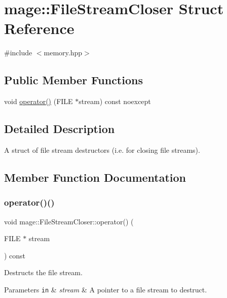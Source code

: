 \hypertarget{structmage_1_1_file_stream_closer}{}\section{mage\+:\+:File\+Stream\+Closer Struct Reference}
\label{structmage_1_1_file_stream_closer}


{\ttfamily \#include $<$memory.\+hpp$>$}

\subsection*{Public Member Functions}
\begin{DoxyCompactItemize}
\item 
void \hyperlink{structmage_1_1_file_stream_closer_a87ef6007ca4e576a96f36c5fd003a386}{operator()} (F\+I\+LE $\ast$stream) const noexcept
\end{DoxyCompactItemize}


\subsection{Detailed Description}
A struct of file stream destructors (i.\+e. for closing file streams). 

\subsection{Member Function Documentation}
\hypertarget{structmage_1_1_file_stream_closer_a87ef6007ca4e576a96f36c5fd003a386}{}\label{structmage_1_1_file_stream_closer_a87ef6007ca4e576a96f36c5fd003a386} 
\subsubsection{\texorpdfstring{operator()()}{operator()()}}
{\footnotesize\ttfamily void mage\+::\+File\+Stream\+Closer\+::operator() (\begin{DoxyParamCaption}\item[{F\+I\+LE $\ast$}]{stream }\end{DoxyParamCaption}) const\hspace{0.3cm}{\ttfamily [noexcept]}}

Destructs the file stream.


\begin{DoxyParams}[1]{Parameters}
\mbox{\tt in}  & {\em stream} & A pointer to a file stream to destruct. \\
\hline
\end{DoxyParams}
